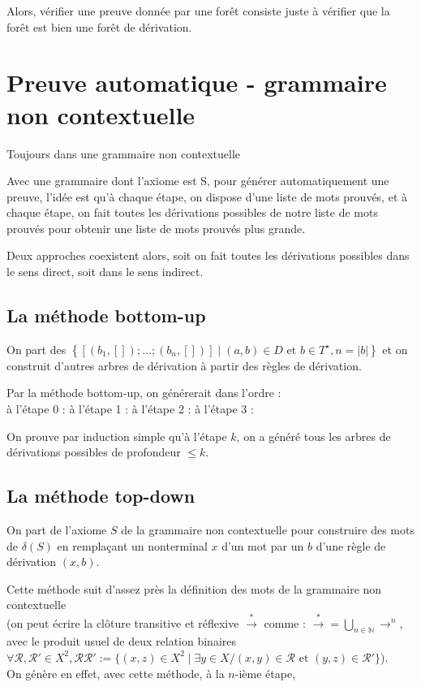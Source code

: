 \documentclass[a4paper,12pt]{article}
\newcommand{\norm}[1]{\lvert #1 \rvert}
\begin{document}

Alors, vérifier une preuve donnée par une forêt consiste juste à vérifier que la forêt est bien une forêt de dérivation.

\section{Preuve automatique - grammaire non contextuelle}

Toujours dans une grammaire non contextuelle

Avec une grammaire dont l'axiome est S,
pour générer automatiquement une preuve, l'idée est qu'à chaque étape,
on dispose d'une liste de mots prouvés,
et à chaque étape, on fait toutes les dérivations possibles de notre liste de mots prouvés pour obtenir une liste de mots prouvés plus grande.

Deux approches coexistent alors, soit on fait toutes les dérivations possibles dans le sens direct, soit dans le sens indirect.

\subsection{La méthode bottom-up}

On part des $\left\{ [(b_1,[]);\dots;(b_n,[])] \mid (a,b)\in D \text{ et } b \in T^\star , n = \norm{b}\right\}$ et on construit d'autres arbres de dérivation à partir des règles de dérivation.

Par la méthode bottom-up, on générerait dans l'ordre :\\
à l'étape 0 :
à l'étape 1 : 
à l'étape 2 : 
à l'étape 3 : 

On prouve par induction simple qu'à l'étape $k$, on a généré tous les arbres de dérivations possibles de profondeur $\leq k$.

\subsection{La méthode top-down}

On part de l'axiome $S$ de la grammaire non contextuelle pour construire des mots de $\delta(S)$ en remplaçant un nonterminal $x$ d'un mot par un $b$ d'une règle de dérivation $(x,b)$.

Cette méthode suit d'assez près la définition des mots de la grammaire non contextuelle\\
(on peut écrire la clôture transitive et réflexive $\overset{*}{\rightarrow}$ comme :
$\overset{*}{\rightarrow} = \bigcup_{n \in \mathbb{N}} \rightarrow ^n$, avec le produit usuel de deux relation binaires $\forall \mathcal{R}, \mathcal{R}' \in X^2, \mathcal{R} \mathcal{R'} := \{(x,z) \in X^2 \mid \exists y \in X / (x,y) \in \mathcal{R} \text{ et } (y,z) \in \mathcal{R}'\} $).\\
On génère en effet, avec cette méthode, à la $n$-ième étape, 
\end{document}
